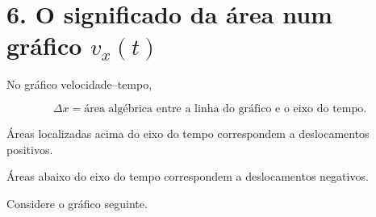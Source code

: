 \documentclass[11pt,a4paper]{article}
\begin{document}
	\section{6. O significado da área num gráfico $v_x(t)$}
	
	\begin{recorda}
		
		No gráfico velocidade--tempo,
		
		\[
		\Delta x=\text{área algébrica entre a linha do gráfico e o eixo do tempo}.
		\]
		
		Áreas localizadas acima do eixo do tempo correspondem a deslocamentos
		positivos.
		
		Áreas abaixo do eixo do tempo correspondem a deslocamentos negativos.
		
	\end{recorda}
	
	Considere o gráfico seguinte.
	
	\begin{center}
		
		
	\end{center}
	
\end{document}
